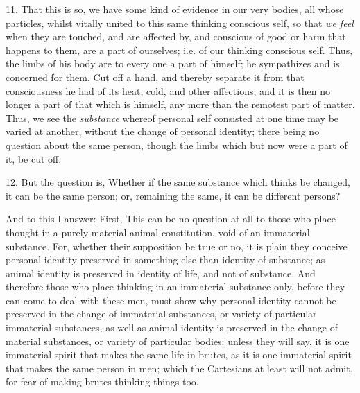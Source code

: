 11. That this is so, we have some kind of evidence in our very bodies,
all whose particles, whilst vitally united to this same thinking
conscious self, so that \textit{we feel} when they are touched, and
are affected by, and conscious of good or harm that happens to them,
are a part of ourselves; i.e. of our thinking conscious self. Thus,
the limbs of his body are to every one a part of himself; he
sympathizes and is concerned for them. Cut off a hand, and thereby
separate it from that consciousness he had of its heat, cold, and
other affections, and it is then no longer a part of that which is
himself, any more than the remotest part of matter. Thus, we see the
\textit{substance} whereof personal self consisted at one time may be
varied at another, without the change of personal identity; there
being no question about the same person, though the limbs which but
now were a part of it, be cut off.

12. But the question is, Whether if the same substance which thinks be
changed, it can be the same person; or, remaining the same, it can be
different persons?

And to this I answer: First, This can be no question at all to those
who place thought in a purely material animal constitution, void of an
immaterial substance. For, whether  their supposition be
true or no, it is plain they conceive personal identity preserved in
something else than identity of substance; as animal identity is
preserved in identity of life, and not of substance. And therefore
those who place thinking in an immaterial substance only, before they
can come to deal with these men, must show why personal identity
cannot be preserved in the change of immaterial substances, or
variety of particular immaterial substances, as well as animal
identity is preserved in the change of material substances, or variety
of particular bodies: unless they will say, it is one immaterial
spirit that makes the same life in brutes, as it is one immaterial
spirit that makes the same person in men; which the Cartesians at
least will not admit, for fear of making brutes thinking things too.

